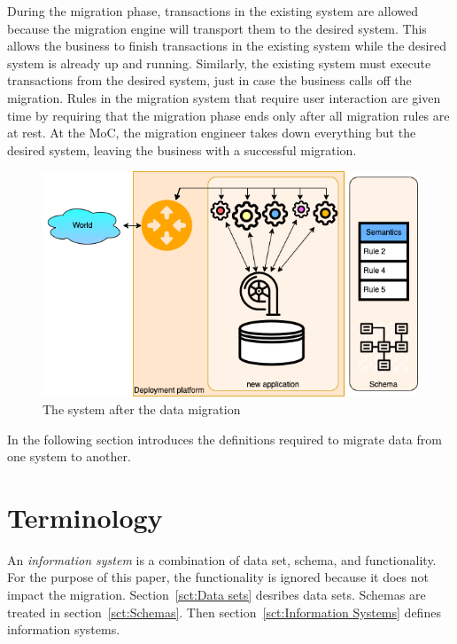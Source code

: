 \documentclass{elsarticle}
\begin{document}
   During the migration phase, transactions in the existing system are allowed because the migration engine will transport them to the desired system.
   This allows the business to finish transactions in the existing system while the desired system is already up and running.
   Similarly, the existing system must execute transactions from the desired system, just in case the business calls off the migration.
   Rules in the migration system that require user interaction are given time by requiring that the migration phase ends
   only after all migration rules are at rest.
   At the MoC, the migration engineer takes down everything but the desired system,
   leaving the business with a successful migration.
\begin{figure}[bht]
   \begin{center}
     \includegraphics[scale=.35]{figures/datamigration-Post-migration.png}
   \end{center}
\caption{The system after the data migration}
\label{fig:post-migration}
\end{figure}

   In the following section introduces the definitions required to migrate data from one system to another.

\section{Terminology}
\label{sct:Terminology}
   An {\em information system} is a combination of data set, schema, and functionality.
   For the purpose of this paper, the functionality is ignored because it does not impact the migration.
   Section~\ref{sct:Data sets} desribes data sets. Schemas are treated in section~\ref{sct:Schemas}.
   Then section~\ref{sct:Information Systems} defines information systems.
\end{document}
